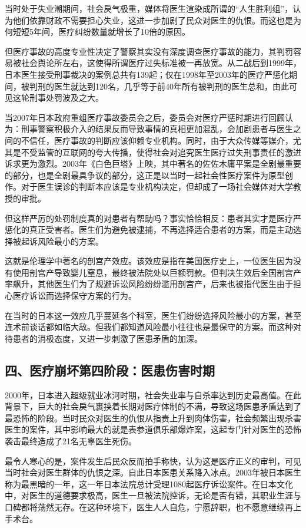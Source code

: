 当时处于失业潮期间，社会戾气极重，媒体将医生渲染成所谓的“人生胜利组”，认为他们依靠财政不需要担心失业，这进一步加剧了民众对医生的仇恨。而这也是为何短短5年间，医疗纠纷数量就增长了10倍的原因。

但医疗事故的高度专业性决定了警察其实没有深度调查医疗事故的能力，其判罚容易被社会舆论所左右，这使得所谓医疗过失标准被一再放宽。从二战后到1999年，日本医生接受刑事裁决的案例总共有139起；仅在1998年至2003年的医疗严惩化期间，被判刑的医生就达到120名，几乎等于前40年所有被判刑的医生总和，由此可见这轮刑事处罚波及之大。

当2007年日本政府重组医疗事故委员会之后，委员会对医疗严惩时期进行回顾认为：刑事警察积极介入的结果反而导致事情的真相更加混乱，会加剧患者与医生之间的不信任，医疗事故的判断应该仰赖专业机构。同时，由于大众传媒等媒介，尤其是不受监管的互联网的夸大传播，使得社会对追究医生医疗过失刑事责任的激进诉求更为激烈。2003年《白色巨塔》上映，其中著名的佐佐木庸平案是全剧最重要的部分，也是全剧最具争议的部分，这正是以当时一起社会性医疗案件为原型创作。对于医生误诊的判断本应该是专业机构决定，但却成了一场社会媒体对大学教授的审批。

但这样严厉的处罚制度真的对患者有帮助吗？事实恰恰相反：患者其实才是医疗严惩化的真正受害者。医生们为避免被逮捕，不再选择适合患者的方案，而是主动选择被起诉风险最小的方案。

这就是伦理学中著名的剖宫产效应。该效应是指在美国医疗史上，一位医生因为没有使用剖宫产导致婴儿窒息，最终被法院处以巨额罚款。但判决生效后全国剖宫产率飙升，其他医生们为了规避诉讼风险纷纷滥用剖宫产，后来也被指代医生由于担心医疗诉讼而选择保守方案的行为。

在当时的日本这一效应几乎蔓延各个科室，医生们纷纷选择风险最小的方案，甚至连术前谈话都如临大敌。但我们都知道风险最小往往也是最保守的方案。而这种对待患者的消极态度，又进一步刺激了医患矛盾的加深。

\subsection{四、医疗崩坏第四阶段：医患伤害时期}

2000年，日本进入超级就业冰河时期，社会失业率与自杀率达到历史最高值。在此背景下，巨大的社会戾气裹挟着长期对医疗体制的不满，导致这场医患矛盾达到了最恐怖的阶段。当时民众对医生的仇恨从指责上升到肉体伤害，社会频繁出现杀害医生的案件，其中影响最大的就是表参道俱乐部爆炸案，这起专门针对医生的恐怖袭击最终造成了21名无辜医生死伤。

最令人寒心的是，案件发生后民众反而拍手称快，认为这是医疗正义的审判，可见当时社会对医生群体的仇恨之深。自此日本医患关系降入冰点。2003年被日本医生称为最黑暗的一年，这一年日本法院总计受理1080起医疗诉讼案件。在日本文化中，对医生的道德要求极高，医生一旦被法院控诉，无论是否有错，其职业生涯与口碑都将荡然无存。在这种环境下，医生人人自危，宁愿辞职，也不愿意继续再上手术台。

